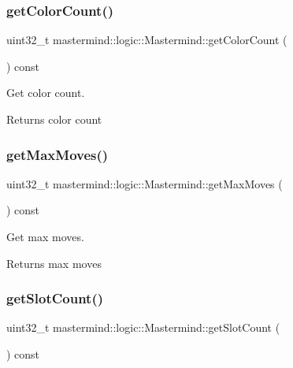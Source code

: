 \subsubsection{\texorpdfstring{get\+Color\+Count()}{getColorCount()}}
{\footnotesize\ttfamily uint32\+\_\+t mastermind\+::logic\+::\+Mastermind\+::get\+Color\+Count (\begin{DoxyParamCaption}{ }\end{DoxyParamCaption}) const}



Get color count. 

\begin{DoxyReturn}{Returns}
color count 
\end{DoxyReturn}
\hypertarget{classmastermind_1_1logic_1_1_mastermind_a7d74266aa973efd0fd9b0cf238c4080f}{}\label{classmastermind_1_1logic_1_1_mastermind_a7d74266aa973efd0fd9b0cf238c4080f} 
\subsubsection{\texorpdfstring{get\+Max\+Moves()}{getMaxMoves()}}
{\footnotesize\ttfamily uint32\+\_\+t mastermind\+::logic\+::\+Mastermind\+::get\+Max\+Moves (\begin{DoxyParamCaption}{ }\end{DoxyParamCaption}) const}



Get max moves. 

\begin{DoxyReturn}{Returns}
max moves 
\end{DoxyReturn}
\hypertarget{classmastermind_1_1logic_1_1_mastermind_a81d6b51ea24fa52073d87d250d7268ff}{}\label{classmastermind_1_1logic_1_1_mastermind_a81d6b51ea24fa52073d87d250d7268ff} 
\subsubsection{\texorpdfstring{get\+Slot\+Count()}{getSlotCount()}}
{\footnotesize\ttfamily uint32\+\_\+t mastermind\+::logic\+::\+Mastermind\+::get\+Slot\+Count (\begin{DoxyParamCaption}{ }\end{DoxyParamCaption}) const}



